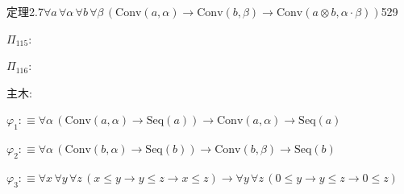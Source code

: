 \begin{fullproof}{定理2.7}{$\forall a\,\forall \alpha\,\forall b\,\forall \beta\,(\mathrm{Conv}(a,\alpha) \to \mathrm{Conv}(b,\beta) \to \mathrm{Conv}(a \otimes b,\alpha \cdot \beta))$}{529}
\begin{ptree}
\end{ptree}
\noindent$\Pi_{115}$:
\begin{ptree}
\noLine
{}
\end{ptree}
\noindent$\Pi_{116}$:
\begin{ptree}
\noLine
{}
\noLine
{}
\end{ptree}
\noindent 主木:
\begin{ptree}
\noLine
{}
\end{ptree}
\begin{abbrevlist}
\item $\varphi_{1} :\equiv \forall \alpha\,(\mathrm{Conv}(a,\alpha) \to \mathrm{Seq}(a)) \to \mathrm{Conv}(a,\alpha) \to \mathrm{Seq}(a)$
\item $\varphi_{2} :\equiv \forall \alpha\,(\mathrm{Conv}(b,\alpha) \to \mathrm{Seq}(b)) \to \mathrm{Conv}(b,\beta) \to \mathrm{Seq}(b)$
\item $\varphi_{3} :\equiv \forall x\,\forall y\,\forall z\,(x \leq y \to y \leq z \to x \leq z) \to \forall y\,\forall z\,(0 \leq y \to y \leq z \to 0 \leq z)$

\end{abbrevlist}
\end{fullproof}
